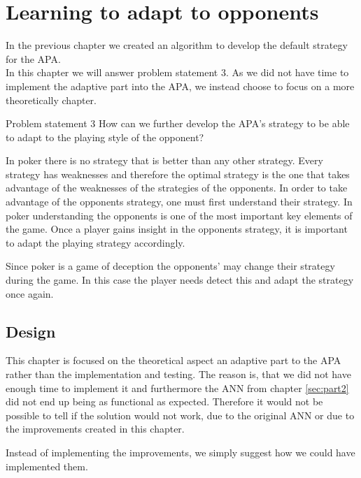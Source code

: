 	\section{Learning to adapt to opponents}
\label{sec:part3}

In the previous chapter we created an algorithm to develop the default strategy for the APA. \\

In this chapter we will answer problem statement 3.
As we did not have time to implement the adaptive part into the APA, we instead choose to focus on a more theoretically chapter.


\vspace{4mm}
\begin{statementBox2}{Problem statement 3}
How can we further develop the APA's strategy to be able to adapt to the playing style of the opponent?
\end{statementBox2}
\vspace{4mm} 


In poker there is no strategy that is better than any other strategy. Every strategy has weaknesses and therefore the optimal strategy is the one that takes advantage of the weaknesses of the strategies of the opponents. In order to take advantage of the opponents strategy, one must first understand their strategy. In poker understanding the opponents is one of the most important key elements of the game. Once a player gains insight in the opponents strategy, it is important to adapt the playing strategy accordingly.


Since poker is a game of deception the opponents' may change their strategy during the game. In this case the player needs detect this and adapt the strategy once again. 

\subsection{Design}
This chapter is focused on the theoretical aspect an adaptive part to the APA rather than the implementation and testing. The reason is, that we did not have enough time to implement it and furthermore the ANN from chapter \ref{sec:part2} did not end up being as functional as expected. Therefore it would not be possible to tell if the solution would not work, due to the original ANN or due to the improvements created in this chapter. 

Instead of implementing the improvements, we simply suggest how we could have implemented them.\\

